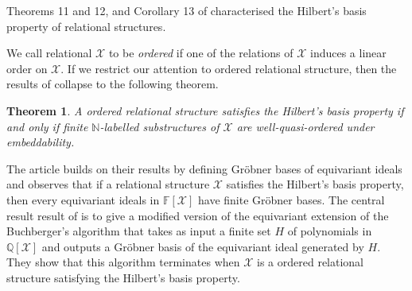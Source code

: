 \documentclass[12pt,a4paper,article]{memoir}
\newcommand{\struct}{\mathcal{X}}
\newcommand{\N}{\mathbb{N}}
\newcommand{\Q}{\mathbb{Q}}
\newcommand{\F}{\mathbb{F}}
\newcommand{\poly}[2]{#1[#2]}
\newcommand{\arka}[1]{}
\newcommand{\emphdef}[1]{\emph{\textcolor{BrickRed}{#1}}}
\newtheorem{theorem}{Theorem}
\theoremstyle{definition}
\begin{document}
Theorems 11 and 12, and Corollary 13 of \cite{GL24} characterised the Hilbert's basis property of relational structures.

\arka{TODO:expand starting from this part}

We call relational $\struct$ to be \emphdef{ordered} if one of the relations of  $\struct$ induces a linear order on $\struct$.
If we restrict our attention to ordered relational structure,
then the results of \cite{GL24} collapse to the following theorem.
%
\begin{theorem}
A ordered relational structure satisfies the Hilbert's basis property if and only if finite $\N$-labelled substructures of $\struct$ are well-quasi-ordered under embeddability.
\end{theorem}
%
The article \cite{GL25} builds on their results by defining Gr\"{o}bner bases of equivariant ideals and observes that if a relational structure $\struct$ satisfies the Hilbert's basis property,
then every equivariant ideals in $\poly{\F}{\struct}$ have finite Gr\"{o}bner bases.
The central result result of \cite{GL25} is to give a modified version of the equivariant extension of the Buchberger's algorithm that takes as input a finite set $H$ of polynomials in $\poly{\Q}{\struct}$ and outputs a Gr\"{o}bner basis of the equivariant ideal generated by $H$.
They show that this algorithm terminates when $\struct$ is a ordered relational structure satisfying the Hilbert's basis property.
%
%
%
%
%
%
%
%
%
%
\end{document}
